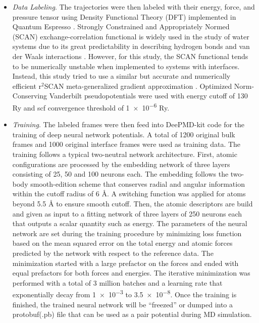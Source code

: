 \begin{itemize}
    \item \emph{Data Labeling}.
          The trajectories were then labeled with their energy, force, and
          pressure
          tensor using Density Functional Theory (DFT) implemented in Quantum
          Espresso
          \cite{QE-2009,QE-2017,QE-2020}. Strongly Constrained and
          Appropriately
          Normed
          (SCAN) exchange-correlation functional is widely used in the study of
          water
          systems due to its great predictability in describing hydrogen bonds
          and
          van
          der Waals interactions \cite{sun2015strongly, chen2017ab}. However,
          for
          this
          study, the SCAN functional tends to be numerically unstable when
          implemented
          to systems with interfaces. Instead, this study tried to use a
          similar but accurate
          and
          numerically efficient r$^2$SCAN meta-generalized gradient
          approximation
          \cite{Furness2020}. Optimized Norm-Conserving Vanderbilt
          pseudopotentials
          \cite{hamann2013optimized} were used with energy cutoff of 130 Ry and
          scf
          convergence threshold of \num{1e-6} Ry.

    \item \emph{Training}. The labeled frames were then feed into DeePMD-kit
          code
          \cite{wang2018deepmd,zeng2023deepmd,lu2021,zhang2018end} for the
          training
          of
          deep neural network potentials. A total of 1200 original bulk frames
          and 1000 original
          interface
          frames were used as training data. The training follows a typical
          two-neutral
          network architecture. First, atomic configurations are processed by
          the
          embedding network of three layers consisting of 25, 50 and 100
          neurons
          each.
          The embedding follows the two-body smooth-edition scheme
          \cite{NEURIPS2018}
          that conserves radial and angular information within the cutoff
          radius of 6
          \r{A}. A switching function was applied for atoms beyond 5.5 \r{A} to
          ensure
          smooth cutoff.	Then, the atomic descriptors are build and
          given as
          input to a
          fitting network of three layers of 250 neurons each that outputs a
          scalar
          quantity such as energy. The parameters of the neural network are
          set
          during
          the training procedure by minimizing	loss function based on the mean
          squared
          error on the total energy and atomic forces predicted
          by the network with respect to the reference data. The minimization
          started with a large prefactor on the forces and ended with equal
          prefactors
          for both forces and energies.    The iterative
          minimization
          was performed with a total of 3 million batches and a learning rate
          that
          exponentially decay from \num{1e-3} to \num{3.5e-8}. Once the
          training is finished, the trained neural network will be  ``freezed''
          or dumped into a protobuf(.pb) file that can be used as a pair
          potential during MD simulation.


\end{itemize}
